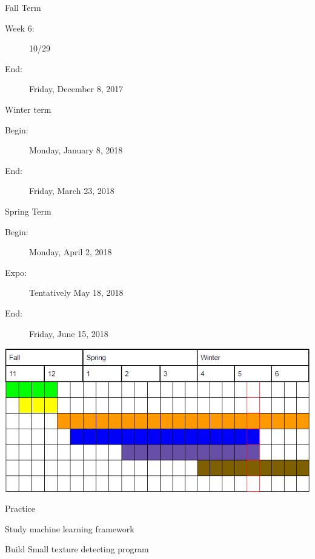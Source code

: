 \documentclass[onecolumn, draftclsnofoot,10pt, compsoc]{IEEEtran}
\begin{document}
Fall Term
\begin{description}
	\item[Week 6:]10/29
	\item[End:]   Friday, December 8, 2017
\end{description}


Winter term
\begin{description}
	\item[Begin:]Monday, January 8, 2018
	\item[End:]	 Friday, March 23, 2018
\end{description}


Spring Term
\begin{description}
	\item[Begin:]Monday, April 2, 2018
	\item[Expo:] 	Tentatively May 18, 2018
	\item[End:]			Friday, June 15, 2018
\end{description}



\includegraphics[scale = 1]{GantProjectReqs.PNG}

\pagebreak

Practice
\begin{description}
	\color{green}
	\item[--]Study machine learning framework
	\color{yellow}
	\item[--]Build Small texture detecting program
\end{description}
\end{document}
